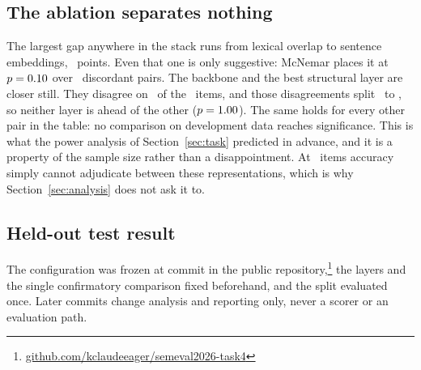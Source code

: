 \documentclass[11pt,letterpaper,twocolumn]{article}
\begin{document}
\subsection{The ablation separates nothing}
The largest gap anywhere in the stack runs from lexical overlap to sentence
embeddings, \McnTfidfVsLTwoDiff\ points. Even that one is only suggestive:
McNemar places it at $p=0.10$ over \McnTfidfVsLTwoDisc\ discordant
pairs. The backbone and the best structural layer are closer still. They
disagree on \McnLTwoVsLThreeXDisc\ of the \DevN\ items, and those disagreements
split \McnLTwoVsLThreeXB\ to \McnLTwoVsLThreeXC, so neither layer is ahead of
the other ($p=1.00$). The same holds for every other pair in the
table: no comparison on development data reaches significance. This is what the
power analysis of Section~\ref{sec:task} predicted in advance, and it is a
property of the sample size rather than a disappointment. At \DevN\ items
accuracy simply cannot adjudicate between these representations, which is why
Section~\ref{sec:analysis} does not ask it to.

\subsection{Held-out test result}

The configuration was frozen at commit \texttt{\FreezeSha} in the public
repository,\footnote{\href{https://github.com/kclaudeeager/semeval2026-task4}{github.com/kclaudeeager/semeval2026-task4}}
the layers and the single confirmatory comparison fixed beforehand, and the
split evaluated once. Later commits change analysis and reporting only, never a
scorer or an evaluation path.
\end{document}
